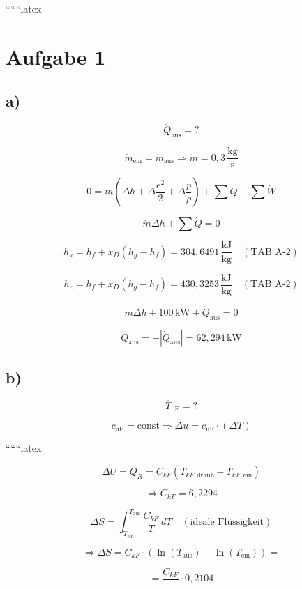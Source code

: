 
``````latex


\section*{Aufgabe 1}

\subsection*{a)}

\[
\dot{Q}_{\text{aus}} = ?
\]

\[
\dot{m}_{\text{ein}} = \dot{m}_{\text{aus}} \Rightarrow \dot{m} = 0,3 \, \frac{\text{kg}}{\text{s}}
\]


\[
0 = \dot{m} \left( \Delta h + \Delta \frac{e^2}{2} + \Delta \frac{p}{\rho} \right) + \sum \dot{Q} - \sum \dot{W}
\]

\[
\dot{m} \Delta h + \sum \dot{Q} = 0
\]

\[
h_a = h_f + x_D (h_g - h_f) = 304,6491 \, \frac{\text{kJ}}{\text{kg}} \quad (\text{TAB A-2})
\]

\[
h_e = h_f + x_D (h_g - h_f) = 430,3253 \, \frac{\text{kJ}}{\text{kg}} \quad (\text{TAB A-2})
\]

\[
\dot{m} \Delta h + 100 \, \text{kW} + \dot{Q}_{\text{aus}} = 0
\]

\[
\dot{Q}_{\text{aus}} = - \left| \dot{Q}_{\text{aus}} \right| = 62,294 \, \text{kW}
\]

\subsection*{b)}

\[
\overline{T}_{\text{uF}} = ?
\]

\[
c_{\text{uF}} = \text{const} \Rightarrow \Delta u = c_{\text{uF}} \cdot (\Delta T)
\]

``````latex

\[
\Delta U = \dot{Q}_R = C_{kF} \left( T_{kF, \text{drauß}} - T_{kF, \text{ein}} \right)
\]

\[
\Rightarrow C_{kF} = 6,2294
\]

\[
\Delta S = \int_{T_{\text{ein}}}^{T_{\text{aus}}} \frac{C_{kF}}{T} \, dT \quad (\text{ideale Flüssigkeit})
\]

\[
\Rightarrow \Delta S = C_{kF} \cdot \left( \ln(T_{\text{aus}}) - \ln(T_{\text{ein}}) \right) =
\]

\[
= \frac{C_{kF}}{} \cdot 0,2104
\]

